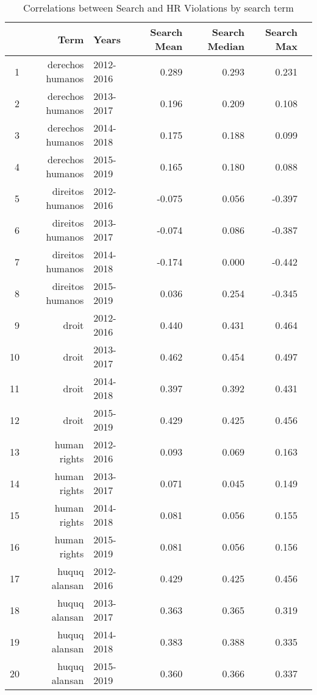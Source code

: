 \begin{table}[ht]
\centering
\begin{tabular}{|r|rlrrrr||}
  \hline
 & Term & Years & Search Mean & Search Median & Search Max \\ 
  \hline
1 & derechos humanos & 2012-2016 & 0.289 & 0.293 & 0.231 \\ 
  2 & derechos humanos & 2013-2017 & 0.196 & 0.209 & 0.108 \\ 
  3 & derechos humanos & 2014-2018 & 0.175 & 0.188 & 0.099 \\ 
  4 & derechos humanos & 2015-2019 & 0.165 & 0.180 & 0.088 \\ 
  5 & direitos humanos & 2012-2016 & -0.075 & 0.056 & -0.397 \\ 
  6 & direitos humanos & 2013-2017 & -0.074 & 0.086 & -0.387 \\ 
  7 & direitos humanos & 2014-2018 & -0.174 & 0.000 & -0.442 \\ 
  8 & direitos humanos & 2015-2019 & 0.036 & 0.254 & -0.345 \\ 
  9 & droit & 2012-2016 & 0.440 & 0.431 & 0.464 \\ 
  10 & droit & 2013-2017 & 0.462 & 0.454 & 0.497 \\ 
  11 & droit & 2014-2018 & 0.397 & 0.392 & 0.431 \\ 
  12 & droit & 2015-2019 & 0.429 & 0.425 & 0.456 \\ 
  13 & human rights & 2012-2016 & 0.093 & 0.069 & 0.163 \\ 
  14 & human rights & 2013-2017 & 0.071 & 0.045 & 0.149 \\ 
  15 & human rights & 2014-2018 & 0.081 & 0.056 & 0.155 \\ 
  16 & human rights & 2015-2019 & 0.081 & 0.056 & 0.156 \\ 
  17 & huquq alansan & 2012-2016 & 0.429 & 0.425 & 0.456 \\ 
  18 & huquq alansan & 2013-2017 & 0.363 & 0.365 & 0.319 \\ 
  19 & huquq alansan & 2014-2018 & 0.383 & 0.388 & 0.335 \\ 
  20 & huquq alansan & 2015-2019 & 0.360 & 0.366 & 0.337 \\ 
   \hline
\end{tabular}
\caption{Correlations between Search and HR Violations by search term} 
\end{table}
